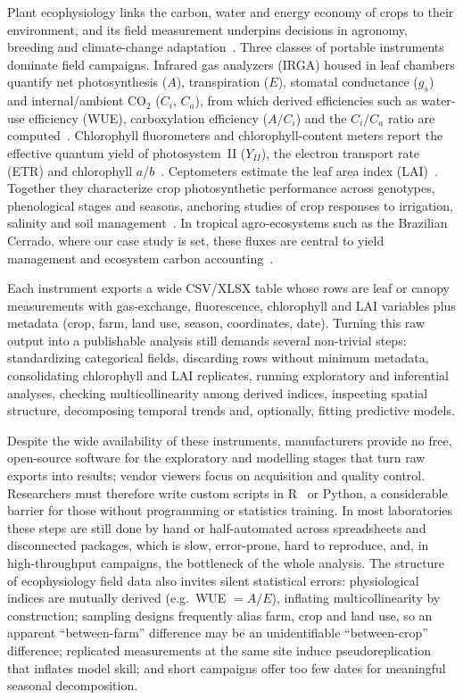 \documentclass[a4paper,fleqn]{cas-dc}
\begin{document}
Plant ecophysiology links the carbon, water and energy economy of crops to their environment, and its field measurement underpins decisions in agronomy, breeding and climate-change adaptation~\cite{Lambers2008,Long2006}. Three classes of portable instruments dominate field campaigns. Infrared gas analyzers (IRGA) housed in leaf chambers quantify net photosynthesis ($A$), transpiration ($E$), stomatal conductance ($g_s$) and internal/ambient CO$_2$ ($C_i$, $C_a$), from which derived efficiencies such as water-use efficiency (WUE), carboxylation efficiency ($A/C_i$) and the $C_i/C_a$ ratio are computed~\cite{Farquhar1980,vonCaemmerer2000,Long2003}. Chlorophyll fluorometers and chlorophyll-content meters report the effective quantum yield of photosystem~II ($Y_{II}$), the electron transport rate (ETR) and chlorophyll $a$/$b$~\cite{Maxwell2000,Baker2008}. Ceptometers estimate the leaf area index (LAI)~\cite{Breda2003}. Together they characterize crop photosynthetic performance across genotypes, phenological stages and seasons, anchoring studies of crop responses to irrigation, salinity and soil management~\cite{Oliveira2017,Munjonji2021,Peters2012,Sanchez2003,Guarrera2024}. In tropical agro-ecosystems such as the Brazilian Cerrado, where our case study is set, these fluxes are central to yield management and ecosystem carbon accounting~\cite{Vourlitis2022}.

Each instrument exports a wide CSV/XLSX table whose rows are leaf or canopy measurements with gas-exchange, fluorescence, chlorophyll and LAI variables plus metadata (crop, farm, land use, season, coordinates, date). Turning this raw output into a publishable analysis still demands several non-trivial steps: standardizing categorical fields, discarding rows without minimum metadata, consolidating chlorophyll and LAI replicates, running exploratory and inferential analyses, checking multicollinearity among derived indices, inspecting spatial structure, decomposing temporal trends and, optionally, fitting predictive models.

Despite the wide availability of these instruments, manufacturers provide no free, open-source software for the exploratory and modelling stages that turn raw exports into results; vendor viewers focus on acquisition and quality control. Researchers must therefore write custom scripts in R~\cite{Rcore} or Python, a considerable barrier for those without programming or statistics training. In most laboratories these steps are still done by hand or half-automated across spreadsheets and disconnected packages, which is slow, error-prone, hard to reproduce, and, in high-throughput campaigns, the bottleneck of the whole analysis. The structure of ecophysiology field data also invites silent statistical errors: physiological indices are mutually derived (e.g.\ WUE $= A/E$), inflating multicollinearity by construction; sampling designs frequently alias farm, crop and land use, so an apparent ``between-farm'' difference may be an unidentifiable ``between-crop'' difference; replicated measurements at the same site induce pseudoreplication~\cite{Hurlbert1984} that inflates model skill; and short campaigns offer too few dates for meaningful seasonal decomposition.
\end{document}
